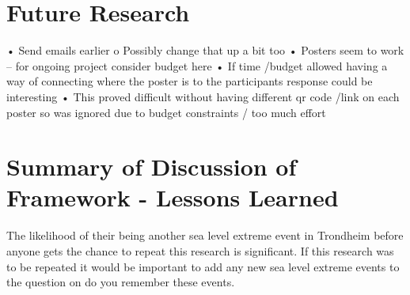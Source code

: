 

\section{Future Research}
•	Send emails earlier
o	Possibly change that up a bit too
•	Posters seem to work – for ongoing project consider budget here
•	If time /budget allowed having a way of connecting where the poster is to the participants response could be interesting
•	This proved difficult without having different qr code /link on each poster so was ignored due to budget constraints / too much effort

\section{Summary of Discussion of Framework - Lessons Learned}


The likelihood of their being another sea level extreme event in Trondheim before anyone gets the chance to repeat this research is significant. If this research was to be repeated it would be important to add any new sea level extreme events to the question on do you remember these events. 


